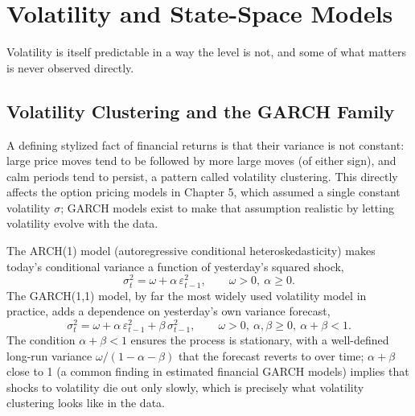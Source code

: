 \documentclass[../ai_in_finance]{subfiles}
\begin{document}
\section{Volatility and State-Space Models}

Volatility is itself predictable in a way the level is not, and some of what matters is never observed directly.

\subsection{Volatility Clustering and the GARCH Family}
\label{sec:garch}

A defining stylized fact of financial returns is that their variance is not constant: large price moves tend to be followed by more large moves (of either sign), and calm periods tend to persist, a pattern called volatility clustering. This directly affects the option pricing models in Chapter 5, which assumed a single constant volatility $\sigma$; GARCH models exist to make that assumption realistic by letting volatility evolve with the data.

The ARCH(1) model (autoregressive conditional heteroskedasticity) makes today's conditional variance a function of yesterday's squared shock,
\begin{equation*}
\sigma_t^2 = \omega + \alpha\, \varepsilon_{t-1}^2, \qquad \omega > 0,\ \alpha \ge 0.
\end{equation*}
The GARCH(1,1) model, by far the most widely used volatility model in practice, adds a dependence on yesterday's own variance forecast,
\begin{equation*}
\sigma_t^2 = \omega + \alpha\, \varepsilon_{t-1}^2 + \beta\, \sigma_{t-1}^2, \qquad \omega > 0,\ \alpha, \beta \ge 0,\ \alpha+\beta < 1.
\end{equation*}
The condition $\alpha + \beta < 1$ ensures the process is stationary, with a well-defined long-run variance $\omega / (1-\alpha-\beta)$ that the forecast reverts to over time; $\alpha + \beta$ close to 1 (a common finding in estimated financial GARCH models) implies that shocks to volatility die out only slowly, which is precisely what volatility clustering looks like in the data.
\end{document}
